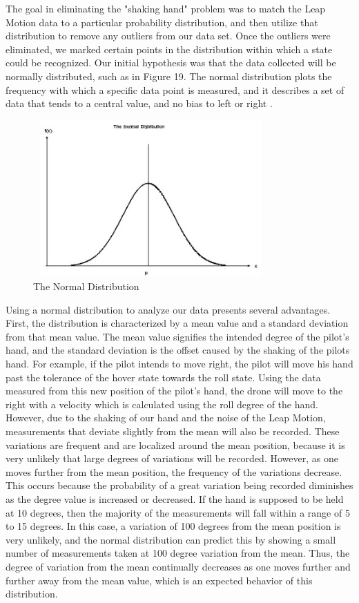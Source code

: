 \documentclass[letterpaper,english, 12pt]{article}
\begin{document}
The goal in eliminating the "shaking hand" problem was to match the Leap Motion data to a particular probability distribution, and then utilize that distribution to remove any outliers from our data set. Once the outliers were eliminated, we marked certain points in the distribution within which a state could be recognized. Our initial hypothesis was that the data collected will be normally distributed, such as in Figure 19. The normal distribution plots the frequency with which a specific data point is measured, and it describes a set of data that tends to a central value, and no bias to left or right \cite{cit3}.

\begin{figure}[t]
	\centering
	\includegraphics[height=6cm,width=90mm]{pics/genNormalDist1.jpg}
	\caption{The Normal Distribution}
\end{figure}

Using a normal distribution to analyze our data presents several advantages. First, the distribution is characterized by a mean value and a standard deviation from that mean value. The mean value signifies the intended degree of the pilot's hand, and the standard deviation is the offset caused by the shaking of the pilots hand. For example, if the pilot intends to move right, the pilot will move his hand past the tolerance of the hover state towards the roll state. Using the data measured from this new position of the pilot's hand, the drone will move to the right with a velocity which is calculated using the roll degree of the hand. However, due to the shaking of our hand and the noise of the Leap Motion, measurements that deviate slightly from the mean will also be recorded. These variations are frequent and are localized around the mean position, because it is very unlikely that large degrees of variations will be recorded. However, as one moves further from the mean position, the frequency of the variations decrease. This occurs because the probability of a great variation being recorded diminishes as the degree value is increased or decreased. If the hand is supposed to be held at 10 degrees, then the majority of the measurements will fall within a range of 5 to 15 degrees. In this case, a variation of 100 degrees from the mean position is very unlikely, and the normal distribution can predict this by showing a small number of measurements taken at 100 degree variation from the mean. Thus, the degree of variation from the mean continually decreases as one moves further and further away from the mean value, which is an expected behavior of this distribution. 
\end{document}
